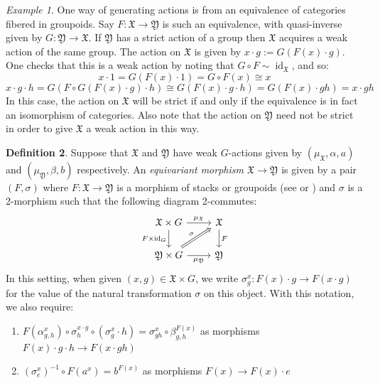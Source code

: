 \documentclass[12pt, final]{amsart}
\theoremstyle{remark}
\newtheorem{example}{Example}[section]
\theoremstyle{definition}
\newtheorem{definition}[example]{Definition}
\theoremstyle{plain}
\newcommand{\fX}{{\mathfrak X}}
\newcommand{\fY}{{\mathfrak Y}}
\DeclareMathOperator{\id}{id}
\begin{document}
\begin{example}
    \label{e:actions}
    One way of generating actions is from an equivalence of categories fibered in 
    groupoids. Say $F:\fX\to \fY$ is such an equivalence, with quasi-inverse 
    given by $G:\fY \to \fX$. If $\fY$ has a strict action of a group then 
    $\fX$ acquires a weak action of the same group. The action on $\fX$ is given 
    by $x\cdot g := G(F(x)\cdot g)$. One checks that this is a weak action 
    by noting that $G\circ F \sim \id_\fX$, and so:
    $$x\cdot 1 = G(F(x)\cdot 1) = G\circ F(x) \cong x $$
    $$x\cdot g \cdot h = G(F\circ G(F(x)\cdot g)\cdot h) \cong G(F(x)\cdot g \cdot h) = G(F(x)\cdot gh) = x\cdot gh$$
    In this case, the action on $\fX$ will be strict if and only if the equivalence
    is in fact an isomorphism of categories. Also note that the action on $\fY$ need 
    not be strict in order to give $\fX$ a weak action in this way.
\end{example}


\begin{definition}
    \label{d:equivariant}
    Suppose that $\fX$ and $\fY$ have weak $G$-actions given by $(\mu_\fX,\alpha, a)$ 
    and $(\mu_\fY,\beta, b)$ respectively. An \emph{equivariant morphism $\fX\to \fY$} is given by a 
    pair $(F,\sigma)$ where $F:\fX \to \fY$ is a morphism of 
    stacks or groupoids (see \cite[1.3 (ii)]{romagny:05} or \cite[3.2]{ginot}) 
    and $\sigma$ is a 2-morphism such that the following diagram 2-commutes:
    $$
    \begin{tikzcd}
        {\fX\times G} & \fX \\
        {\fY\times G} & \fY
        \arrow["{\mu_\fX}", from=1-1, to=1-2]
        \arrow["{F\times\id_G}"', from=1-1, to=2-1]
        \arrow["F", from=1-2, to=2-2]
        \arrow["\sigma", Rightarrow, from=2-1, to=1-2]
        \arrow["{\mu_\fY}"', from=2-1, to=2-2]
    \end{tikzcd}
    $$
    In this setting, when given $(x,g) \in \fX \times G$, we write 
    $\sigma_g^x:F(x)\cdot g \to F(x\cdot g)$ for the value of the natural 
    transformation $\sigma$ on this object. With this notation, we also require:
    \begin{enumerate}
        \item $F(\alpha^{x}_{g,h}) \circ \sigma^{x\cdot g}_{h}\circ (\sigma_{g}^{x}\cdot h) = \sigma^{x}_{gh}\circ\beta^{F(x)}_{g,h} $ 
        as morphisms $F(x)\cdot g \cdot h \to F(x\cdot gh)$
        \item $(\sigma_{e}^{x})^{-1}\circ F(a^{x}) = b^{F(x)}$ as morphisms $F(x) \to F(x)\cdot e$ 
    \end{enumerate}
\end{definition}
\end{document}

